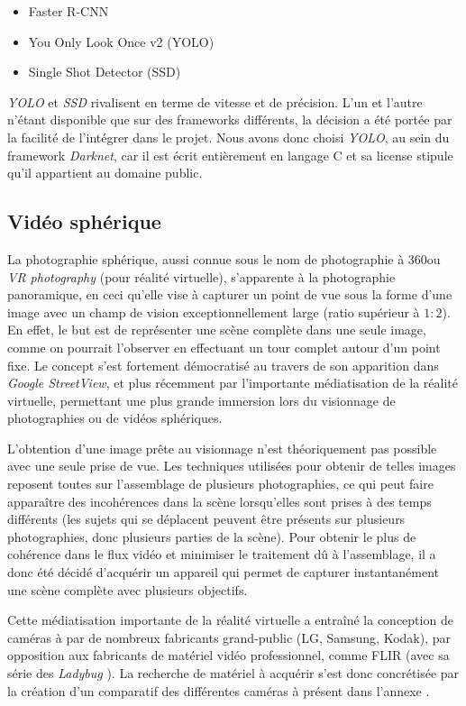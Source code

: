 			\begin{itemize}[noitemsep]
				\item Faster R-CNN\cite{fasterrcnn}
				\item You Only Look Once v2 (YOLO)\cite{yolo}
				\item Single Shot Detector (SSD)\cite{ssd}
			\end{itemize}
			
			\emph{YOLO} et \emph{SSD} rivalisent en terme de vitesse et de précision. L'un et l'autre n'étant disponible que sur des frameworks différents, la décision a été portée par la facilité de l'intégrer dans le projet. Nous avons donc choisi \emph{YOLO}, au sein du framework \emph{Darknet}, car il est écrit entièrement en langage C et sa license stipule qu'il appartient au domaine public.
			

		\subsection{Vidéo sphérique}
			La photographie sphérique, aussi connue sous le nom de photographie à 360\degre ou \emph{VR photography} (pour réalité virtuelle), s'apparente à la photographie panoramique, en ceci qu'elle vise à capturer un point de vue sous la forme d'une image avec un champ de vision exceptionnellement large (ratio supérieur à $1:2$)\cite{fnumpano}. En effet, le but est de représenter une scène complète dans une seule image, comme on pourrait l'observer en effectuant un tour complet autour d'un point fixe. Le concept s'est fortement démocratisé au travers de son apparition dans \emph{Google StreetView}, et plus récemment par l'importante médiatisation de la réalité virtuelle, permettant une plus grande immersion lors du visionnage de photographies ou de vidéos sphériques.
			\par
			L'obtention d'une image prête au visionnage n'est théoriquement pas possible avec une seule prise de vue. Les techniques utilisées pour obtenir de telles images reposent toutes sur l'assemblage de plusieurs photographies, ce qui peut faire apparaître des incohérences dans la scène lorsqu'elles sont prises à des temps différents (les sujets qui se déplacent peuvent être présents sur plusieurs photographies, donc plusieurs parties de la scène). Pour obtenir le plus de cohérence dans le flux vidéo et minimiser le traitement dû à l'assemblage, il a donc été décidé d'acquérir un appareil qui permet de capturer instantanément une scène complète avec plusieurs objectifs.
			\par
			Cette médiatisation importante de la réalité virtuelle a entraîné la conception de caméras à \degre par de nombreux fabricants grand-public (LG, Samsung, Kodak), par opposition aux fabricants de matériel vidéo professionnel, comme FLIR (avec sa série des \emph{Ladybug} \cite{ladybug}). La recherche de matériel à acquérir s'est donc concrétisée par la création d'un comparatif des différentes caméras à \degre présent dans l'annexe \todoref.
			
